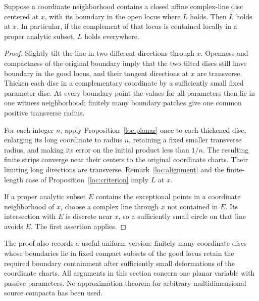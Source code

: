 \begin{corollary}\label{loc:disc}
Suppose a coordinate neighborhood contains a closed affine
complex-line disc centered at $x$, with its boundary in the open
locus where $L$ holds. Then $L$ holds at $x$.
In particular, if the complement of that locus is contained
locally in a proper analytic subset, $L$ holds everywhere.
\end{corollary}

\begin{proof}
Slightly tilt the line in two different directions through $x$.
Openness and compactness of the original boundary imply that the
two tilted discs still have boundary in the good locus, and their
tangent directions at $x$ are transverse. Thicken each disc in a
complementary coordinate by a sufficiently small fixed parameter
disc. At every boundary point the values for all parameters then
lie in one witness neighborhood; finitely many boundary patches
give one common positive transverse radius.

For each integer $n$, apply Proposition~\ref{loc:planar} once to
each thickened disc, enlarging its long coordinate to radius
$n$, retaining a fixed smaller transverse radius, and making its
error on the initial product less than $1/n$. The resulting
finite strips converge near their centers to the original
coordinate charts. Their limiting long directions are transverse.
Remark~\ref{loc:alignment} and the finite-length case of
Proposition~\ref{loc:criterion} imply $L$ at $x$.

If a proper analytic subset $E$ contains the exceptional points
in a coordinate neighborhood of $x$, choose a complex line
through $x$ not contained in $E$. Its intersection with $E$ is
discrete near $x$, so a sufficiently small circle on that line
avoids $E$. The first assertion applies.
\end{proof}

\begin{remark}
The proof also records a useful uniform version: finitely many
coordinate discs whose boundaries lie in fixed compact subsets of
the good locus retain the required boundary containment after
sufficiently small deformations of the coordinate charts.
All arguments in this section concern one planar variable with
passive parameters. No approximation theorem for arbitrary
multidimensional source compacta has been used.
\end{remark}
